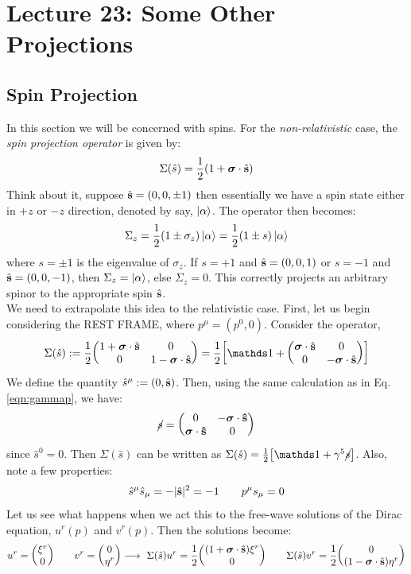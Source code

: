 \section*{Lecture 23: Some Other Projections }
\subsection{Spin Projection}
In this section we will be concerned with spins. For the \textit{non-relativistic} case, the \textit{spin projection operator} is given by:
$$\Sigma(\hat{s}) = \frac{1}{2}\qty(1+ \boldsymbol{\sigma}\cdot \hat{\vb{s}}) $$
Think about it, suppose $\hat{\vb{s}} = (0,0,\pm 1)$ then essentially we have a spin state either in $+z$ or $-z$ direction, denoted by say, $\ket{\alpha}$. The operator then becomes:
$$\Sigma_z = \frac{1}{2}(1\pm\sigma_z)\ket{\alpha} = \frac{1}{2}(1\pm s)\ket{\alpha}$$
where $s= \pm 1$ is the eigenvalue of $\sigma_z$. If $s=+1$ and $\hat{\vb{s}}=(0,0,1)$ or $s=-1$ and $\hat{\vb{s}}=(0,0,-1)$, then $\Sigma_z = \ket{\alpha}$, else $\Sigma_z = 0$. This correctly projects an arbitrary spinor to the appropriate spin $\hat{\vb{s}}$.\\[0.2cm]
We need to extrapolate this idea to the relativistic case. First, let us begin considering the REST FRAME, where $p^\mu = (p^0, 0)$. Consider the operator,
$$\Sigma(\hat{s}) := \frac{1}{2}\mqty(1+\bs{\sigma}\cdot \hat{\vb{s}} & 0\\ 0 & 1-\bs{\sigma}\cdot \hat{\vb{s}})=\frac{1}{2}\qty[\iden +\mqty(\bs{\sigma}\cdot \hat{\vb{s}} & 0\\0 &  -\bs{\sigma}\cdot \hat{\vb{s}})]$$
We define the quantity $\hat{s}^\mu:= (0, \hat{\vb{s}})$. Then, using the same calculation as in Eq.\ref{eqn:gammap}, we have:
$${\gsl{{s}}} = \mqty( 0 & -\bs{\sigma}\cdot \vb{\hat{s}} \\ \bs{\sigma}\cdot \vb{\hat{s}} & 0 )$$
since $\hat{s}^0 = 0$. Then $\Sigma({\hat{s}})$ can be written as $\Sigma({\hat{s}} )= \frac{1}{2}\qty[\iden + \gamma^5{\gsl{{s}}} ]$. Also, note a few properties:
\begin{equation}\label{eqn:spinproj}
    \hat{s}^\mu \hat{s}_\mu = - |\hat{\vb{s}}|^2 = -1\qquad p^\mu s_\mu = 0
\end{equation} Let us see what happens when we act this to the free-wave solutions of the Dirac equation, $u^r(p)$ and $v^r(p)$. Then the solutions become:
\begin{align*}
    u^r = \mqty(\xi^r\\ 0) \qquad v^r = \mqty(0 \\ \eta^r)\longrightarrow\ \Sigma(\hat{s})u^r = \frac{1}{2}\mqty((1+\bs{\sigma}\cdot \hat{\vb{s}})\xi^r\\ 0)\qquad \Sigma(\hat{s})v^r = \frac{1}{2}\mqty(0\\ (1-\bs{\sigma}\cdot \hat{\vb{s}})\eta^r)
\end{align*}
